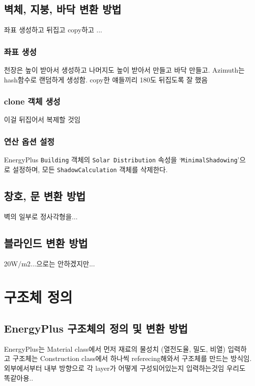 \subsection{벽체, 지붕, 바닥 변환 방법}
좌표 생성하고 뒤집고 copy하고 ...

\subsubsection{좌표 생성}
천장은 높이 받아서 생성하고 나머지도 높이 받아서 만들고 바닥 만들고.
Azimuth는 hash함수로 랜덤하게 생성함. copy한 얘들끼리 180도 뒤집도록 잘 했음

\subsubsection{clone 객체 생성}
이걸 뒤집어서 복제할 것임

\subsubsection{연산 옵션 설정}
EnergyPlus \texttt{Building} 객체의 \texttt{Solar Distribution} 속성을 `\texttt{MinimalShadowing}'으로 설정하며, 모든 \texttt{ShadowCalculation} 객체를 삭제한다.

\subsection{창호, 문 변환 방법}
벽의 일부로 정사각형을...

\subsection{블라인드 변환 방법}
20W/m2...으로는 안하겠지만...


\section{구조체 정의}
\subsection{EnergyPlus 구조체의 정의 및 변환 방법}
EnergyPlus는 Material class에서 먼저 재료의 물성치 (열전도율, 밀도, 비열) 입력하고 구조체는 Construction class에서 하나씩 referecing해와서 구조체를 만드는 방식임.
외부에서부터 내부 방향으로 각 layer가 어떻게 구성되어있는지 입력하는것임 
우리도 똑같아용..

